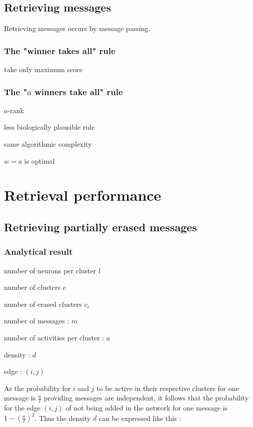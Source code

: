 \documentclass[english,11pt,twocolumn]{article}
\theoremstyle{definition}
\begin{document}
	\subsection{Retrieving messages}	
		
		Retrieving messages occurs by message passing.		
		
		\subsubsection{The "winner takes all" rule}
		
		take only maximum score
	
		\subsubsection{The "$a$ winners take all" rule}
		
		$a$-rank
		
		less biologically plausible rule
		
		same algorithmic complexity
		
		$w = a$	is optimal

	\section{Retrieval performance}	
	

	\subsection{Retrieving partially erased messages}		
		
	\subsubsection{Analytical result}
		
	number of neurons per cluster $l$
	
	number of clusters $c$
	
	number of erased clusters $c_e$
	
	number of messages : $m$
	
	number of activities per cluster : $a$
	
	density : $d$

	edge : $(i, j)$
	
	As the probability for $i$ and $j$ to be active in their respective clusters for one message is $\frac{a}{l}$ providing messages are independent, it follows that the probability for the edge $(i,j)$ of not being added in the network for one message is $1 - \left(\frac{a}{l}\right)^2$. Thus the density $d$ can be expressed like this :
	
\end{document}
